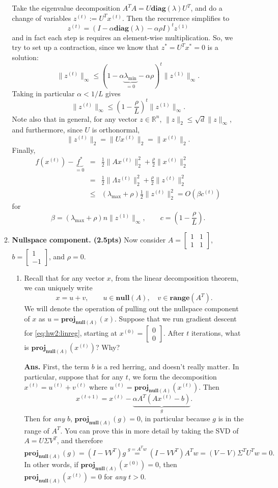 \documentclass{article}
\newcommand{\diag}{\mathbf{diag}}
\newcommand{\R}{\mathbb R}
\newcommand{\proj}{\mathbf{proj}}
\newcommand{\range}{\mathbf{range}}
\newcommand{\vnull}{\mathbf{null}}
\newcommand{\bmat}{\left[\begin{matrix}}
\newcommand{\emat}{\end{matrix}\right]}
\newcommand{\showsolution}[1]{\textbf{Ans.} \;#1}
\begin{document}
\begin{enumerate}
\begin{enumerate}
{Take the eigenvalue decomposition $A^TA = U \diag(\lambda) U^T$, and  do a change of variables $z^{(t)} := U^Tx^{(t)}$. Then the recurrence simplifies to
\[
z^{(t)} = (I-\alpha \diag(\lambda)- \alpha \rho I)^t z^{(1)}
\]
and in fact each step is requires an element-wise multiplication. So, we try to set up a contraction, since we know that $z^* = U^Tx^* = 0$ is a solution:
\[
\|z^{(t)}\|_\infty \leq (1 - \alpha \underbrace{\lambda_{\min}}_{=0} - \alpha \rho)^t\|z^{(1)}\|_\infty.
\]
Taking in particular $\alpha < 1/L$ gives
\[
\|z^{(t)}\|_\infty \leq \left(1-\frac{\rho}{L}\right)^t\|z^{(1)}\|_\infty.
\]
Note also that in general, for any vector $z\in \R^n$, $\|z\|_2 \leq \sqrt{d}\|z\|_\infty$, and furthermore, since $U$ is orthonormal, 
\[
\|z^{(t)}\|_2 = \|Ux^{(t)}\|_2 = \|x^{(t)}\|_2.
\]
Finally, 
\begin{eqnarray*}
f(x^{(t)}) - \underbrace{f^*}_{=0} &=& \frac{1}{2}\|Ax^{(t)}\|_2^2 + \frac{\rho}{2}\|x^{(t)}\|_2^2 \\
&=& \frac{1}{2}\|\Lambda z^{(t)}\|_2^2 + \frac{\rho}{2}\|z^{(t)}\|_2^2\\
&\leq & (\lambda_{\max} + \rho)\frac{1}{2}\|z^{(t)}\|_2^2 = O(\beta c^{(t)})
\end{eqnarray*}
for 
\[
\beta =  (\lambda_{\max} + \rho)n\|z^{(1)}\|_\infty, \qquad c = \left(1-\frac{\rho}{L}\right).
\]
}



\item \textbf{Nullspace component. (2.5pts)} Now consider $A = \bmat 1 & 1 \\ 1 & 1 \emat$,  $b = \bmat 1 \\ -1\emat $, and $\rho = 0$. 

\begin{enumerate}
\item Recall that for any vector $x$, from the linear decomposition theorem, we can uniquely write 
\[
x = u + v, \qquad u \in \vnull(A), \quad v\in \range(A^T).
\]
We will denote the operation of pulling out the nullspace component of $x$ as $u = \proj_{\vnull(A)}(x)$. 
Suppose that we run gradient descent for \eqref{eq:hw2:linreg}, starting at $x^{(0)} = \bmat 0 \\ 0 \emat$. After $t$ iterations, what is $\proj_{\vnull(A)}(x^{(t)})$? Why?


\showsolution{
First, the term $b$ is a red herring, and doesn't really matter. In particular, suppose that for any $t$, we form the decomposition $x^{(t)} = u^{(t)} + v^{(t)}$ where $u^{(t)} = \proj_{\vnull(A)}(x^{(t)})$. Then 
\[
x^{(t+1)} = x^{(t)} - \underbrace{\alpha A^T(Ax^{(t)}-b)}_{g}.
\]
Then for \emph{any} $b$, $\proj_{\vnull(A)}(g) = 0$, in particular because $g$ is in the range of $A^T$. You can prove this in more detail by taking the SVD of $A = U\Sigma V^T$, and therefore 
\[
\proj_{\vnull(A)}(g) = (I - VV^T)g \overset{g=A^Tw}{=} (I-VV^T)A^Tw=(V-V)\Sigma^T U^Tw = 0.
\]
In other words, if $\proj_{\vnull(A)}(x^{(0)}) = 0$, then $\proj_{\vnull(A)}(x^{(t)}) = 0$ for \emph{any} $t>0$.

}
\end{enumerate}
\end{enumerate}
\end{enumerate}
\end{document}
